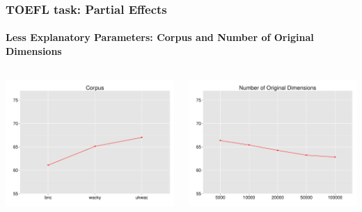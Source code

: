 \documentclass[t]{beamer} %
\begin{document}
\begin{frame}
  \frametitle{TOEFL task: Partial Effects}
  \framesubtitle{Less Explanatory Parameters: Corpus and Number of Original Dimensions}
  \begin{columns}

    \begin{column}{0.5\textwidth}
      \centering
      \hspace*{-18pt}   \includegraphics[scale=0.30]{img/lapesa_toefl_main_corpus}

    \end{column}
    \begin{column}{0.5\textwidth}
      \hspace*{-18pt} 
      \includegraphics[scale=0.30]{img/lapesa_toefl_main_origdim}
    \end{column}
  \end{columns}
  
\end{frame}
\end{document}

